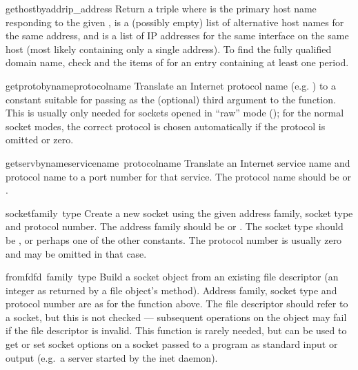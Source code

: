 \begin{funcdesc}{gethostbyaddr}{ip_address}
Return a triple  where
 is the primary host name responding to the given
,  is a (possibly empty) list of
alternative host names for the same address, and  is
a list of IP addresses for the same interface on the same
host (most likely containing only a single address).
To find the fully qualified domain name, check  and the
items of  for an entry containing at least one period.
\end{funcdesc}

\begin{funcdesc}{getprotobyname}{protocolname}
Translate an Internet protocol name (e.g. ) to a constant
suitable for passing as the (optional) third argument to the
 function.  This is usually only needed for sockets
opened in ``raw'' mode (); for the normal socket modes,
the correct protocol is chosen automatically if the protocol is
omitted or zero.
\end{funcdesc}

\begin{funcdesc}{getservbyname}{servicename\, protocolname}
Translate an Internet service name and protocol name to a port number
for that service.  The protocol name should be  or
.
\end{funcdesc}

\begin{funcdesc}{socket}{family\, type}
Create a new socket using the given address family, socket type and
protocol number.  The address family should be  or
.  The socket type should be ,
 or perhaps one of the other  constants.
The protocol number is usually zero and may be omitted in that case.
\end{funcdesc}

\begin{funcdesc}{fromfd}{fd\, family\, type}
Build a socket object from an existing file descriptor (an integer as
returned by a file object's  method).  Address family,
socket type and protocol number are as for the  function
above.  The file descriptor should refer to a socket, but this is not
checked --- subsequent operations on the object may fail if the file
descriptor is invalid.  This function is rarely needed, but can be
used to get or set socket options on a socket passed to a program as
standard input or output (e.g.\ a server started by the \UNIX{} inet
daemon).
\end{funcdesc}

